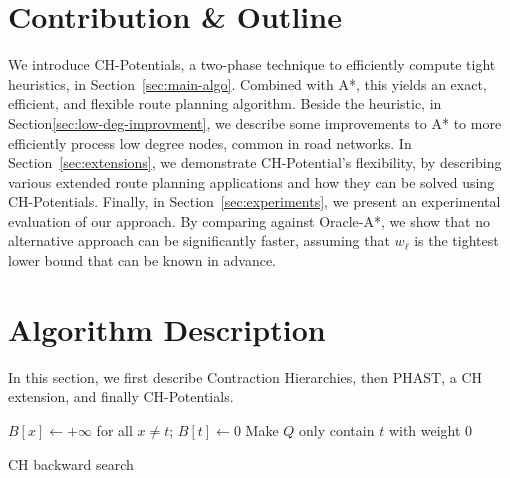\documentclass[letterpaper]{article} %
\begin{document}
\section{Contribution \& Outline}

We introduce CH-Potentials, a two-phase technique to efficiently compute tight heuristics, in Section~\ref{sec:main-algo}.
Combined with A*, this yields an exact, efficient, and flexible route planning algorithm.
Beside the heuristic, in Section\ref{sec:low-deg-improvment}, we describe some improvements to A* to more efficiently process low degree nodes, common in road networks.
In Section~\ref{sec:extensions}, we demonstrate CH-Potential's flexibility, by describing various extended route planning applications and how they can be solved using CH-Potentials.
Finally, in Section~\ref{sec:experiments}, we present an experimental evaluation of our approach.
By comparing against Oracle-A*, we show that no alternative approach can be significantly faster, assuming that $w_\ell$ is the tightest lower bound that can be known in advance.

\section{Algorithm Description}

In this section, we first describe Contraction Hierarchies, then PHAST, a CH extension, and finally CH-Potentials.

\label{sec:main-algo}

\begin{algorithm2e}
$B[x] \leftarrow +\infty$ for all $x\neq t$;
$B[t] \leftarrow 0$\;
Make $Q$ only contain $t$ with weight $0$\;
\caption{CH backward search}
\label{algo:ch-backward}
\end{algorithm2e}
\end{document}
